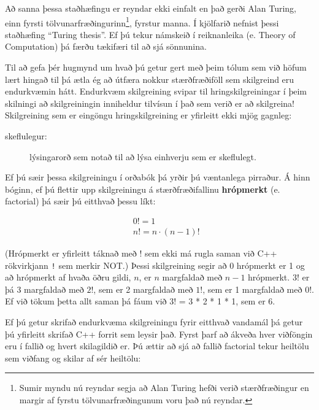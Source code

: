 
Að sanna þessa staðhæfingu er reyndar ekki einfalt en það gerði Alan Turing, einn fyrsti tölvunarfræðingurinn\footnote{Sumir myndu nú reyndar segja að Alan Turing hefði verið stærðfræðingur en margir af fyrstu tölvunarfræðingunum voru það nú reyndar.}, fyrstur manna.
Í kjölfarið nefnist þessi staðhæfing ``Turing thesis''.
Ef þú tekur námskeið í reiknanleika (e. Theory of Computation) þá færðu tækifæri til að sjá sönnunina.

Til að gefa þér hugmynd um hvað þú getur gert með þeim tólum sem við höfum lært hingað til þá ætla ég að útfæra nokkur stærðfræðiföll sem skilgreind eru endurkvæmin hátt.
Endurkvæm skilgreining svipar til hringskilgreiningar í þeim skilningi að skilgreiningin inniheldur tilvísun í það sem verið er að skilgreina!
Skilgreining sem er eingöngu hringskilgreining er yfirleitt ekki mjög gagnleg:

\begin{description}

\item[skeflulegur:] lýsingarorð sem notað til að lýsa einhverju sem er skeflulegt.


\end{description}

Ef þú sæir þessa skilgreiningu í orðabók þá yrðir þú væntanlega pirraður.
Á hinn bóginn, ef þú flettir upp skilgreiningu á stærðfræðifallinu {\bf hrópmerkt} (e. factorial) þá sæir þú eitthvað þessu líkt:

\begin{eqnarray*}
&&  0! = 1 \\
&&  n! = n \cdot (n-1)!
\end{eqnarray*}

(Hrópmerkt er yfirleitt táknað með $!$ sem ekki má rugla saman við C++ rökvirkjann {\tt !} sem merkir NOT.)
Þessi skilgreining segir að 0 hrópmerkt er 1 og að hrópmerkt af hvaða öðru gildi, $n$, er $n$ margfaldað með $n-1$ hrópmerkt.
$3!$ er þá 3 margfaldað með $2!$, sem er 2 margfaldað með
$1!$, sem er 1 margfaldað með 0!.
Ef við tökum þetta allt saman þá fáum við $3!$ = 3 * 2 * 1 * 1, sem er 6.

Ef þú getur skrifað endurkvæma skilgreiningu fyrir eitthvað vandamál þá getur þú yfirleitt skrifað C++ forrit sem leysir það.
Fyrst þarf að ákveða hver viðföngin eru í fallið og hvert skilagildið er.
Þú ættir að sjá að fallið factorial tekur heiltölu sem viðfang og skilar af sér heiltölu:

